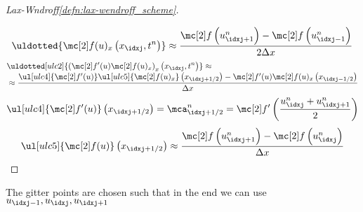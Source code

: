 \begin{proofbox}
\begin{proof}[\newline Lax-Wndroff\cref{defn:lax-wendroff_scheme}]
\begin{align*}
        \end{align*}
        \begin{align*}
          \uldotted{\flux(u)_{x} \left(x_{\idxj},t^{n}\right)}\approx\frac{\flux \left(u_{\idxj+1}^{n}\right)-\flux \left(u_{\idxj-1}^{n}\right)}{2\Delta x}
        \end{align*}
        \begin{align*}
          &\uldotted[ulc2]{\left(\flux'(u)\flux(u)_{x}\right)_{x} \left(x_{\idxj},t^{n}\right)}\approx \\[-1\jot]
          &\approx
          \frac{\ul[ulc4]{\flux'(u)}\ul[ulc5]{\flux(u)_{x}}\left(x_{\idxj+1/2}\right)-\flux'(u)\flux(u)_{x}\left(x_{\idxj-1/2}\right)}{\Delta x}
        \end{align*}
        \begin{align*}
          \ul[ulc4]{\flux'(u)}\left(x_{\idxj+1/2}\right)=\mca_{\idxj+1/2}^{n}
          =\flux' \left(\frac{u_{\idxj}^{n}+u_{\idxj+1}^{n}}{2}\right)
        \end{align*}
        \begin{align*}
          \ul[ulc5]{\flux(u)}\left(x_{\idxj+1/2}\right)\approx
          \frac{\flux \left(u_{\idxj+1}^{n}\right)-\flux \left(u_{\idxj}^{n}\right)}{\Delta x}
        \end{align*}
    \end{proof}
\end{proofbox}
\begin{notebox}[Note]\nospacing
    The gitter points are chosen such that in the end we can use $u_{\idxj-1},u_{\idxj},u_{\idxj+1}$
\end{notebox}

